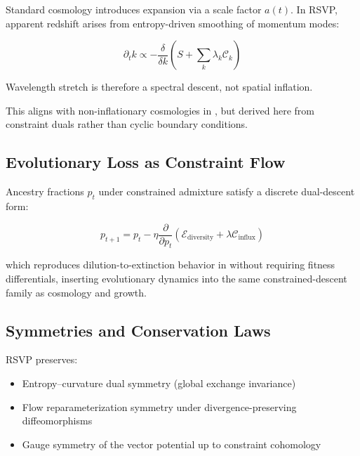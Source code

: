 \documentclass[11pt,a4paper]{article}
\begin{document}
Standard cosmology introduces expansion via a scale factor \(a(t)\). In RSVP, apparent redshift arises from entropy-driven smoothing of momentum modes:

\begin{equation}
\partial_t k \propto - \frac{\delta}{\delta k} \left( S + \sum_k \lambda_k \mathcal{C}_k \right)
\end{equation}

Wavelength stretch is therefore a spectral descent, not spatial inflation.

This aligns with non-inflationary cosmologies in \citet{Turok2012}, but derived here from constraint duals rather than cyclic boundary conditions.

\subsection{Evolutionary Loss as Constraint Flow}

Ancestry fractions \(p_t\) under constrained admixture satisfy a discrete dual-descent form:

\begin{equation}
p_{t+1} = p_t - \eta \frac{\partial}{\partial p_t}
\left( \mathcal{E}_{\text{diversity}} + \lambda \mathcal{C}_{\text{influx}} \right)
\end{equation}

which reproduces dilution-to-extinction behavior in \citet{Amadei2025} without requiring fitness differentials, inserting evolutionary dynamics into the same constrained-descent family as cosmology and growth.

\subsection{Symmetries and Conservation Laws}

RSVP preserves:

\begin{itemize}
    \item Entropy–curvature dual symmetry (global exchange invariance)
    \item Flow reparameterization symmetry under divergence-preserving diffeomorphisms
    \item Gauge symmetry of the vector potential up to constraint cohomology
\end{itemize}
\end{document}
